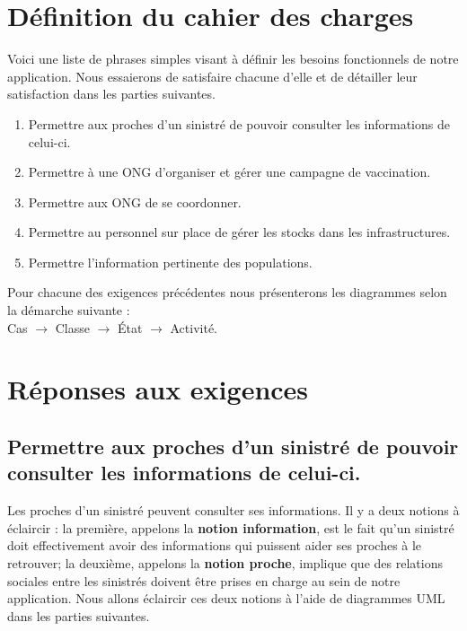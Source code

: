\documentclass[11pt, titlepage]{report}
\begin{document}
\section{Définition du cahier des charges}
Voici une liste de phrases simples visant à définir les besoins fonctionnels de notre application. Nous essaierons de satisfaire chacune d'elle et de détailler leur satisfaction dans les parties suivantes.
\begin{enumerate}
\item Permettre aux proches d'un sinistré de pouvoir consulter les informations de celui-ci.
\item Permettre à une ONG d'organiser et gérer une campagne de vaccination.
\item Permettre aux ONG de se coordonner.
\item Permettre au personnel sur place de gérer les stocks dans les infrastructures.
\item Permettre l'information pertinente des populations.
\end{enumerate}
Pour chacune des exigences précédentes nous présenterons les diagrammes selon la démarche suivante : \\
Cas $\rightarrow$ Classe $\rightarrow$ État $\rightarrow$ Activité.

\section{Réponses aux exigences}
\subsection{Permettre aux proches d'un sinistré de pouvoir consulter les informations de celui-ci.}
Les proches d'un sinistré peuvent consulter ses informations. Il y a deux notions à éclaircir : la première, appelons la \textbf{notion information}, est le fait qu'un sinistré doit effectivement avoir des informations qui puissent aider ses proches à le retrouver; la deuxième, appelons la \textbf{notion proche}, implique que des relations sociales entre les sinistrés doivent être prises en charge au sein de notre application. Nous allons éclaircir ces deux notions à l'aide de diagrammes UML dans les parties suivantes.
\end{document}
